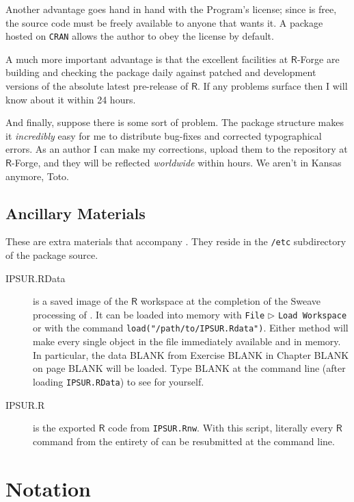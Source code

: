 Another advantage goes hand in hand with the Program's license; since \IPSUR is free, the source code must be freely available to anyone that wants it. A package hosted on \texttt{CRAN} allows the author to obey the license by default.

A much more important advantage is that the excellent facilities at \(\mathsf{R}\)-Forge are building and checking the package daily against patched and development versions of the absolute latest pre-release of \(\mathsf{R}\). If any problems surface then I will know about it within 24 hours.

And finally, suppose there is some sort of problem. The package structure makes it \emph{incredibly} easy for me to distribute bug-fixes and corrected typographical errors. As an author I can make my corrections, upload them to the repository at \(\mathsf{R}\)-Forge, and they will be reflected \emph{worldwide} within hours. We aren't in Kansas anymore, Toto.

\subsection*{Ancillary Materials}

These are extra materials that accompany \IPSUR. They reside in the \texttt{/etc} subdirectory of the package source. 

\begin{description}
\item[IPSUR.RData] is a saved image of the \(\mathsf{R}\) workspace at the completion of the Sweave processing of \IPSUR. It can be loaded into memory with \texttt{File} \(\triangleright\) \texttt{Load Workspace} or with the command \texttt{load("/path/to/IPSUR.Rdata")}. Either method will make every single object in the file immediately available and in memory. In particular, the data BLANK from Exercise BLANK in Chapter BLANK on page BLANK will be loaded. Type BLANK at the command line (after loading \texttt{IPSUR.RData}) to see for yourself.
\item[IPSUR.R] is the exported \(\mathsf{R}\) code from \texttt{IPSUR.Rnw}. With this script, literally every \(\mathsf{R}\) command from the entirety of \IPSUR can be resubmitted at the command line.
\end{description}

\section*{Notation}


